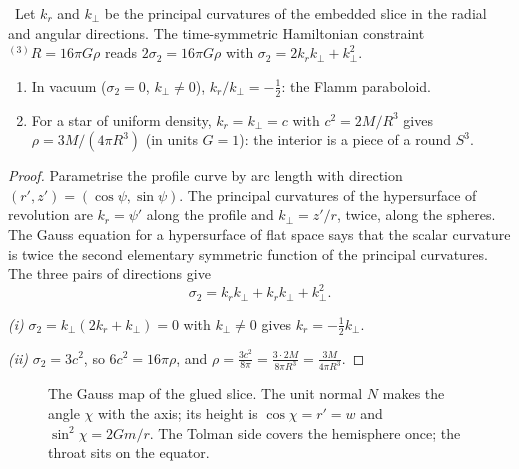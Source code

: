 \begin{proposition}\label{prop:principal}\ver\
Let $k_r$ and $k_\perp$ be the principal curvatures of the embedded slice in the radial and angular directions. The time-symmetric Hamiltonian constraint ${}^{(3)}R=16\pi G\rho$ reads $2\sigma_2=16\pi G\rho$ with $\sigma_2=2k_rk_\perp+k_\perp^2$.
\begin{enumerate}[label=(\roman*)]
\item In vacuum ($\sigma_2=0$, $k_\perp\ne0$), $k_r/k_\perp=-\frac12$: the Flamm paraboloid.
\item For a star of uniform density, $k_r=k_\perp=c$ with $c^2=2M/R^3$ gives $\rho=3M/(4\pi R^3)$ (in units $G=1$): the interior is a piece of a round $S^3$.
\end{enumerate}
\end{proposition}
\begin{proof}
Parametrise the profile curve by arc length with direction $(r',z')=(\cos\psi,\sin\psi)$. The principal curvatures of the hypersurface of revolution are $k_r=\psi'$ along the profile and $k_\perp=z'/r$, twice, along the spheres. The Gauss equation for a hypersurface of flat space says that the scalar curvature is twice the second elementary symmetric function of the principal curvatures. The three pairs of directions give
\[
\sigma_2=k_rk_\perp+k_rk_\perp+k_\perp^2 .
\]

\emph{(i)} $\sigma_2=k_\perp(2k_r+k_\perp)=0$ with $k_\perp\ne0$ gives $k_r=-\frac12k_\perp$.

\emph{(ii)} $\sigma_2=3c^2$, so $6c^2=16\pi\rho$, and $\rho=\frac{3c^2}{8\pi}=\frac{3\cdot2M}{8\pi R^3}=\frac{3M}{4\pi R^3}$.
\end{proof}


\begin{figure}[t]
\centering
{}
\caption{The Gauss map of the glued slice. The unit normal $N$ makes the angle $\chi$ with the axis; its height is $\cos\chi=r'=w$ and $\sin^2\chi=2Gm/r$. The Tolman side covers the hemisphere once; the throat sits on the equator.}
\label{fig:gauss}
\end{figure}

